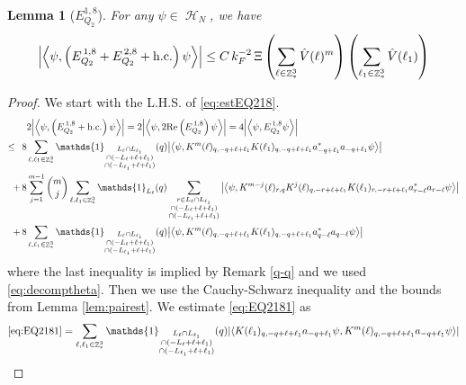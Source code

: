 \documentclass[sn-mathphys, Numbered ,a4paper]{sn-jnl}%
\DeclareMathOperator{\Z}{\mathbb{Z}}
\DeclareMathOperator{\HH}{\mathcal{H}}
\newcommand{\eva}[1]{\left\langle #1 \right\rangle}
\theoremstyle{plain}
\newtheorem{lemma}[theorem]{Lemma}
\theoremstyle{definition}
\theoremstyle{remark}
\theoremstyle{plain}
\theoremstyle{definition}
\theoremstyle{remark}
\begin{document}
\begin{lemma}[$E_{Q_2}^{1,8}$]\label{lem:EQ218}
	For any $\psi \in \HH_N$, we have
	\begin{alignat}{2}
		\abs{\eva{\psi,\left(E^{\,1,8}_{Q_2}+E^{\,2,8}_{Q_2}+\mathrm{h.c.}\right) \psi }}
		\leq  C\, k_{F}^{-2}\, \Xi \left(\sum\limits_{\ell \in \Z^3_*} \hat{V}(\ell)^m \right) \left(\sum\limits_{\ell_1 \in \Z^3_*} \hat{V}(\ell_1) \right) \label{eq:estEQ218}  
	\end{alignat}
\end{lemma}
\begin{proof}
 We start with the L.H.S. of \eqref{eq:estEQ218}.
\begin{align}
	&2\abs{\eva{\psi,\left(E^{\,1,8}_{Q_2}+\mathrm{h.c.}\right) \psi }} = 2\abs{\eva{\psi,2\mathrm{Re}\left(E^{\,1,8}_{Q_2}\right) \psi }} = 4\abs{\eva{\psi, E^{\,1,8}_{Q_2} \psi }}\nonumber\\
	\leq\,\;8& \sum\limits_{\ell, \ell_1\in \Z^3_*} \mathds{1}_{\substack{L_{\ell}\cap L_{\ell_1}\\\cap (-L_{\ell}+\ell+\ell_1) \\ \cap (-L_{\ell_1}+\ell+\ell_1)}}(q) \abs{\eva{\psi, K^m(\ell)_{q,-q+\ell+\ell_1} K(\ell_1)_{q,-q+\ell+\ell_1} a^*_{-q+\ell_1}a_{-q+\ell_1} \psi }} \label{eq:EQ2181}\\
	+\,8& \sum\limits_{j=1}^{m-1} {{m}\choose j} \sum\limits_{\ell, \ell_1\in \Z^3_*}\mathds{1}_{L_{\ell}}(q) \sum\limits_{\substack{r\in L_{\ell} \cap L_{\ell_1}\\\cap (-L_{\ell}+\ell+\ell_1) \\ \cap (-L_{\ell_1}+\ell+\ell_1)}}  \abs{\eva{\psi, K^{m-j}(\ell)_{r,q} K^j(\ell)_{q,-r+\ell+\ell_1} K(\ell_1)_{r,-r+\ell+\ell_1} a^*_{r-\ell}a_{r-\ell} \psi }} \label{eq:EQ2182}\\
	+\,8&\sum\limits_{\ell, \ell_1\in \Z^3_*} \mathds{1}_{\substack{L_{\ell}\cap L_{\ell_1}\\\cap (-L_{\ell}+\ell+\ell_1) \\ \cap (-L_{\ell_1}+\ell+\ell_1)}} (q) \abs{\eva{\psi, K^m(\ell)_{q,-q+\ell+\ell_1}K(\ell_1)_{q,-q+\ell+\ell_1} a^*_{q-\ell}a_{q-\ell}\psi }} \label{eq:EQ2183}
\end{align}
where the last inequality is implied by Remark \ref{q-q} and we used \eqref{eq:decomptheta}. Then we use the Cauchy-Schwarz inequality and the bounds from Lemma \ref{lem:pairest}.
We estimate \eqref{eq:EQ2181} as 
\begin{align}
	 \eqref{eq:EQ2181}
	&= \sum\limits_{\ell, \ell_1\in \Z^3_*} \mathds{1}_{\substack{L_{\ell}\cap L_{\ell_1}\\\cap (-L_{\ell}+\ell+\ell_1) \\ \cap (-L_{\ell_1}+\ell+\ell_1)}}(q) \abs{\eva{ K(\ell_1)_{q,-q+\ell+\ell_1} a_{-q+\ell_1} \psi, K^m(\ell)_{q,-q+\ell+\ell_1} a_{-q+\ell_1} \psi }}\nonumber\\

\end{align}
\end{proof}
\end{document}
